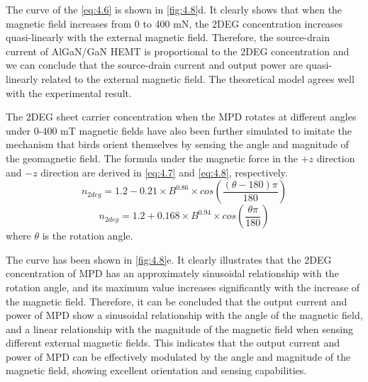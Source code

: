                                      

The curve of the \autoref{eq:4.6} is shown in \autoref{fig:4.8}d. It clearly shows that when the magnetic field  increases from 0 to 400 \unit{\mN}, the 2DEG  concentration increases quasi-linearly with the external magnetic field. Therefore, the source-drain current of AlGaN/GaN HEMT  is proportional to the 2DEG concentration and we can conclude that the source-drain current and  output power are quasi-linearly related to the external magnetic field. The theoretical model agrees well with the experimental result.

The 2DEG sheet carrier concentration  when the MPD rotates at different angles under 0-400 \unit{\milli\tesla} magnetic fields have also been further simulated to imitate the mechanism that birds orient themselves by sensing the angle and magnitude of the geomagnetic field. The formula under the magnetic force in the $+z$ direction and $-z$ direction are derived in \autoref{eq:4.7} and \autoref{eq:4.8}, respectively.
\begin{equation}
	n_{2deg}=1.2-0.21\times B^{0.86}\times cos \left( \frac{(\theta -180)\pi}{180} \right)
\label{eq:4.7}
\end{equation}
\begin{equation}
	n_{2deg}=1.2+0.168\times B^{0.94}\times cos \left( \frac{\theta\pi}{180} \right)
\label{eq:4.8}
\end{equation}
where $\theta$ is the rotation angle.

The  curve has been shown in \autoref{fig:4.8}e. It clearly illustrates that the 2DEG concentration  of MPD has an approximately sinusoidal relationship with the rotation angle, and its maximum value increases significantly with the increase of the magnetic field. Therefore, it can be concluded that the output current and power of MPD show a sinusoidal relationship with the angle of the magnetic field, and a linear relationship with the magnitude of the magnetic field when sensing different external magnetic fields. This indicates that the output current and power of MPD can be effectively modulated by the angle and magnitude of the magnetic field, showing excellent orientation and sensing capabilities.


